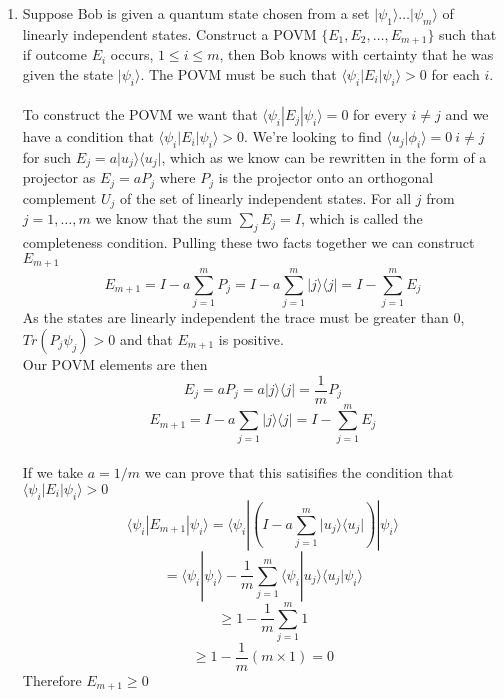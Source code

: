 \documentclass[12pt]{article}
\newcommand{\ket}[1]{\vert{#1}\rangle}
\newcommand{\bra}[1]{\langle{#1}\vert}
\begin{document}
\begin{enumerate}
\item Suppose Bob is given a quantum state chosen from a set $\ket{\psi_1} \ldots \ket{\psi_m}$ of linearly independent states. Construct a POVM $\{E_1, E_2, \ldots , E_{m+1}\}$ such that if outcome $E_i$ occurs, $1 \leq i \leq m$, then Bob knows with certainty that he was given the state $\ket{\psi_i}$. The POVM must be such that $\langle \psi_i | E_i | \psi_i \rangle > 0$ for each $i$. 
\\
\\
To construct the POVM we want that $\langle \psi_i | E_j | \psi_i \rangle = 0$ for every $i \neq j$ and we have a condition that $\langle \psi_i | E_i | \psi_i \rangle > 0$. We're looking to find $\langle u_j | \phi_i \rangle = 0 \ i \neq j$ for such $E_j = a \ket{u_j}\bra{u_j}$, which as we know can be rewritten in the form of a projector as $E_j = a P_j$ where $P_j$ is the projector onto an orthogonal complement $U_j$ of the set of linearly independent states. 
For all $j$ from $j = 1, \ldots , m$ we know that the sum $\sum_j E_j = I$, which is called the completeness condition. Pulling these two facts together we can construct $E_{m+1}$ 
$$ E_{m+1} = I - a \sum_{j=1}^m P_j = I - a \sum_{j=1}^m \ket{j} \bra{j}  = I - \sum_{j=1}^m E_j$$ 
As the states are linearly independent the trace must be greater than 0, $Tr(P_j \psi_j) > 0$ and that $E_{m+1}$ is positive. 
\\
Our POVM elements are then 
$$ E_j = a P_j = a \ket{j}\bra{j} = \frac{1}{m} P_j $$
$$ E_{m+1} = I - a \sum_{j=1} \ket{j} \bra{j} = I - \sum_{j=1}^m E_j $$
\\
If we take $a = 1/m$  we can prove that this satisifies the condition that $\langle \psi_i | E_i | \psi_i \rangle > 0$ 
$$ \langle \psi_i | E_{m+1} | \psi_i \rangle = \langle \psi_i | (I - a \sum_{j=1}^m \ket{u_j}\bra{u_j}) | \psi_i \rangle $$
$$ = \langle \psi_i | \psi_i \rangle - \frac{1}{m} \sum_{j=1}^m \langle \psi_i | u_j \rangle \langle u_j | \psi_i \rangle $$ 
$$ \geq 1 - \frac{1}{m} \sum_{j=1}^m 1 $$
$$ \geq 1- \frac{1}{m} (m \times 1) = 0 $$
Therefore $ E_{m+1} \geq 0$ 


\end{enumerate}
\end{document}
